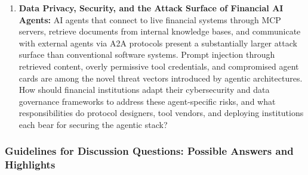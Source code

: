 \documentclass{article}
\begin{document}
\begin{enumerate}
    \item \textbf{Data Privacy, Security, and the Attack Surface of Financial AI Agents:} AI agents that connect to live financial systems through MCP servers, retrieve documents from internal knowledge bases, and communicate with external agents via A2A protocols present a substantially larger attack surface than conventional software systems. Prompt injection through retrieved content, overly permissive tool credentials, and compromised agent cards are among the novel threat vectors introduced by agentic architectures. How should financial institutions adapt their cybersecurity and data governance frameworks to address these agent-specific risks, and what responsibilities do protocol designers, tool vendors, and deploying institutions each bear for securing the agentic stack?
\end{enumerate}

\subsubsection*{Guidelines for Discussion Questions: Possible Answers and Highlights}
\end{document}
